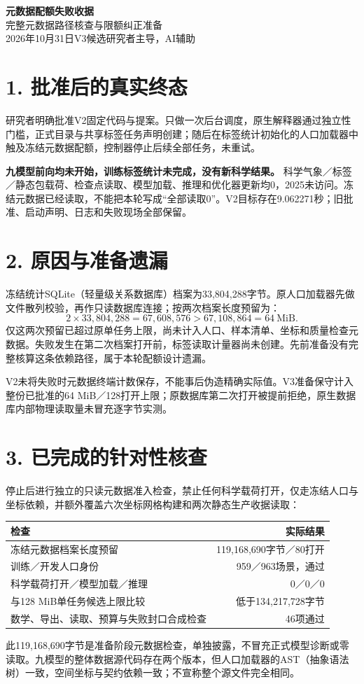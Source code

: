 \documentclass[UTF8,a4paper,10pt,fontset=none]{ctexart}
\newcommand{\key}[1]{\textcolor{ink}{\textbf{#1}}}
\newcommand{\code}[1]{{\small\texttt{\detokenize{#1}}}}
\begin{document}
{\LARGE\bfseries 元数据配额失败收据}\\[4pt]
{\Large 完整元数据路径核查与限额纠正准备}\\[6pt]
2026年10月31日\quad V3候选\quad 研究者主导，AI辅助

\section*{1. 批准后的真实终态}
研究者明确批准V2固定代码\code{9d63713}与提案\code{0be1a2b4}。只做一次后台调度，原生解释器通过独立性门槛，正式目录与共享标签任务声明创建；随后在标签统计初始化的人口加载器中触及冻结元数据配额，控制器停止后续全部任务，未重试。

\key{九模型前向均未开始，训练标签统计未完成，没有新科学结果。}
科学气象／标签／静态包载荷、检查点读取、模型加载、推理和优化器更新均0，2025未访问。冻结元数据已经读取，不能把本轮写成“全部读取0”。V2目标存在9.062271秒；旧批准、启动声明、日志和失败现场全部保留。

\section*{2. 原因与准备遗漏}
冻结统计SQLite（轻量级关系数据库）档案为33,804,288字节。原人口加载器先做文件散列校验，再作只读数据库连接；按两次档案长度预留为：
\[
2\times33,804,288=67,608,576>67,108,864=64~\mathrm{MiB}.
\]
仅这两次预留已超过原单任务上限，尚未计入人口、样本清单、坐标和质量检查元数据。失败发生在第二次档案打开前，标签读取计量器尚未创建。先前准备没有完整核算这条依赖路径，属于本轮配额设计遗漏。

V2未将失败时元数据终端计数保存，不能事后伪造精确实际值。V3准备保守计入整份已批准的64 MiB／128打开上限；原数据库第二次打开被提前拒绝，原生数据库内部物理读取量未冒充逐字节实测。

\section*{3. 已完成的针对性核查}
停止后进行独立的只读元数据准入检查，禁止任何科学载荷打开，仅走冻结人口与坐标依赖，并额外覆盖六次坐标网格构建和两次静态生产收据读取：
\begin{center}\small
\begin{tabularx}{\linewidth}{@{}Xr@{}}
\toprule
检查 & 实际结果\\
\midrule
冻结元数据档案长度预留 & 119,168,690字节／80打开\\
训练／开发人口身份 & 959／963场景，通过\\
科学载荷打开／模型加载／推理 & 0／0／0\\
与128 MiB单任务候选上限比较 & 低于134,217,728字节\\
数学、导出、读取、预算与失败封口合成检查 & 46项通过\\
\bottomrule
\end{tabularx}
\end{center}
此119,168,690字节是准备阶段元数据检查，单独披露，不冒充正式模型诊断或零读取。九模型的整体数据源代码存在两个版本，但人口加载器的AST（抽象语法树）一致，空间坐标与契约依赖一致；不宣称整个源文件完全相同。
\end{document}
